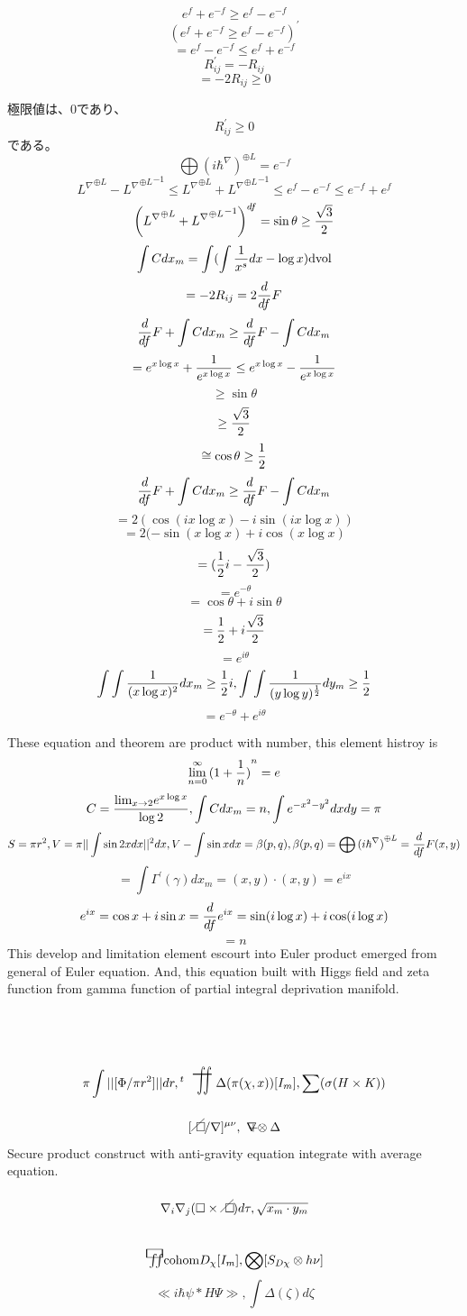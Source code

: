 \documentclass{jsarticle}
\begin{document}
  $$ e^{f} + e^{-f} \ge e^{f} - e^{-f} $$
  $$  (e^{f} + e^{-f} \ge e^{f} - e^{-f})^{'} $$
  $$ = e^{f} - e^{-f} \le e^{f} + e^{-f} $$
  $$ R^{'}_{ij} = - R_{ij} $$
  $$ = -2 R_{ij} \ge 0 $$

  極限値は、0であり、
  $$ R^{'}_{ij} \ge 0 $$
  である。
  $$ \bigoplus{(i \hbar^{\nabla})}^{\oplus L} = e^{-f} $$
  $$ {L^{\nabla}}^{\oplus L} - {{L^{\nabla}}^{\oplus L}}^{-1} 
  \le {L^{\nabla}}^{\oplus L} + {{L^{\nabla}}^{\oplus L}}^{-1} \le
  e^{f} - e^{-f} \le e^{-f} + e^{f} $$
  $$ \left({L^{\nabla}}^{\oplus L} + {{L^{\nabla}}^{\oplus L}}^{-1}\right)^{df}
  = \sin \theta \ge {\sqrt{3} \over 2} $$
  $$ \int C dx_m = \int(\int {1 \over x^s}dx - \log x)\mathrm{dvol} $$
  $$ = -2 R_{ij} = 2 {d \over df}F $$
  $$ {d \over df}F + \int C dx_m \ge {d \over df}F - \int C dx_m $$
  $$ = e^{x \log x} + {1 \over e^{x \log x}} \le e^{x \log x} - {1 \over e^{x \log x}} $$
  $$ \ge \sin \theta $$
  $$ \ge {\sqrt{3} \over 2} $$
  $$ \cong \cos \theta \ge {1 \over 2}$$
  $$ {d \over df}F + \int C dx_m \ge {d \over df}F - \int C dx_m $$
  $$ = 2(\cos(i x\log x) - i\sin(i x\log x)) $$
  $$ = 2(-\sin(x \log x) + i\cos(x \log x) $$
  $$ = ({1 \over  2}i - {{\sqrt{3} \over 2})} $$
  $$ = e^{-\theta} $$
  $$ = \cos \theta + i \sin \theta $$
  $$ = {{1 \over 2}} + i{{\sqrt{3} \over 2}}$$
  $$ = e^{i\theta} $$
  $$ \int \int{1 \over (x \log x)^{2}}dx_m \ge {1 \over 2}i, \int \int{1 \over (y \log y)^{1 \over 2}}dy_m
  \ge {1 \over 2} $$
  $$ = e^{-\theta} + e^{i\theta} $$

	These equation and theorem are product with number,
	this element histroy is
	$$ \lim_{n=0}^{\infty}{(1 + {1 \over n})}^{n} = e $$
	$$ C = {{\lim_{x\to 2}}e^{x\log x} \over \log 2}, \int C dx_m = n, 
	 \int e^{-x^2 - y^2}dxdy = \pi $$
	$$ S = \pi r^2, V = \pi ||\int \sin 2x dx||^{2}dx, 
	 V - \int \sin x dx = \beta(p,q), \beta(p,q) = \bigoplus
	{(i \hbar^{\nabla})}^{\oplus L} = {d \over {d f}}F(x,y) $$
	$$ = \int \Gamma^{'}(\gamma)dx_m 
          = (x,y)\cdot (x,y) = e^{ix} $$
	$$ e^{ix} = \cos x + i \sin x 
	 = {d \over {d f}}e^{ix} = \sin(i\log x) + i\cos(i\log x) $$
	$$ = n $$
	This develop and limitation element escourt into Euler product 
	emerged from general of Euler equation.
	And, this equation built with Higgs field and zeta function
	from gamma function of partial integral deprivation manifold.

	$$ \pi \int ||[\Phi / \pi r^2]||dr, {}^{t}\scalebox{1.0}[2]{
		\variint} \Delta(\pi(\chi,x))[I_m], 
		 \sum(\sigma(H \times K)) $$
		$$ [\alearletter / \nabla]^{\mu\nu}, 
         \secproduct \otimes \Delta $$
	 Secure product construct with anti-gravity equation integrate with
	 average equation.
	$$ \nabla_{i}\nabla_{j}(\square \times \alearletter)d\tau, 
	 \sqrt{x_m\cdot y_m} $$
	$$ \squareiint \mathrm{cohom}D_{\chi}[I_m],
	\bigotimes [S_{D\chi} \otimes h\nu] $$
	$$ \ll i\hbar \psi \ast H\Psi \gg, 
	 \int \Delta(\zeta)d\zeta $$
\end{document}
